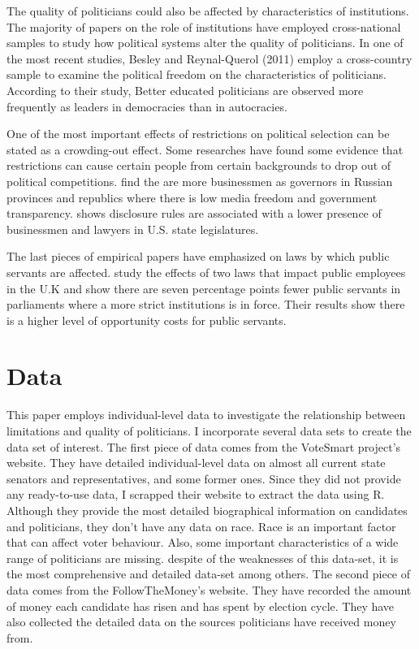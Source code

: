 \documentclass[12pt,english]{article}
\begin{document}
The quality of politicians could also be affected by characteristics of institutions. The majority of papers on the role of institutions have employed cross-national samples to study how political systems alter the quality of politicians. In one of the most recent studies, Besley and Reynal-Querol (2011) employ a cross-country sample to examine the political freedom on the characteristics of politicians. According to their study, Better educated politicians are observed more frequently as leaders in democracies than in autocracies.

One of the most important effects of restrictions on political selection can be stated as a crowding-out effect. Some researches have found some evidence that restrictions can cause certain people from certain backgrounds to drop out of political competitions.  \cite{10.2307/27821948} find the are more businessmen as governors in Russian provinces and republics where there is low media freedom and government transparency. \cite{doi:10.1177/106591290605900411}  shows disclosure rules are associated with a lower presence of businessmen and lawyers in U.S. state legislatures.

The last pieces of empirical papers have emphasized on laws by which public servants are affected. \cite{BRAENDLE2016696} study the effects of two laws that impact public employees in the U.K and show there are seven percentage points fewer public servants in parliaments where a more strict institutions is in force. Their results show there is a higher level of opportunity costs for public servants. 

\section{Data}\label{sec:data}
This paper employs individual-level data to investigate the relationship between limitations and quality of politicians.
I incorporate several data sets to create the data set of interest. The first piece of data comes from the VoteSmart project's website. They have detailed individual-level data on almost all current state senators and representatives, and some former ones. Since they did not provide any ready-to-use data, I scrapped their website to extract the data using R. Although they provide the most detailed biographical information on candidates and politicians, they don't have any data on race. Race is an important factor that can affect voter behaviour. Also, some important characteristics of a wide range of politicians are missing. despite of the weaknesses of this data-set, it is the most comprehensive and detailed data-set among others. 
The second piece of data comes from the FollowTheMoney's website. They have recorded the amount of money each candidate has risen and has spent by election cycle. They have also collected the detailed data on the sources politicians have received  money from.
\end{document}
